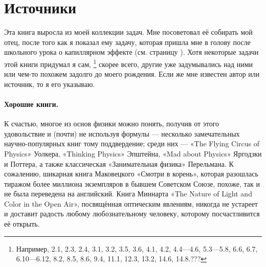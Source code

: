 \section{Источники}

Эта книга выросла из моей коллекции задач.
Мне посоветовал её собирать мой отец, после того как я показал ему задачу, которая пришла мне в голову после школьного урока о капиллярном эффекте (см. страницу \pageref{???}).
Хотя некоторые задачи этой книги придумал я сам,%
\footnote{Например, 2.1, 2.3, 2.4, 3.1, 3.2, 3.5, 3.6, 4.1, 4.2, 4.4---4.6, 5.3---5.8, 6.6, 6.7,
6.10---6.12, 8.2, 8.5, 8.6, 9.4, 11.1, 12.3, 13.2, 14.6, 14.8.???}
скорее всего, другие уже задумывались над ними или чем-то похожем задолго до моего рождения.
Если же мне известен автор или источник, то я его указываю.

\paragraph{Хорошие книги.}
К счастью, %
многое из основ физики можно понять, получив от этого удовольствие и (почти) не используя формулы ---
несколько замечательных научно-популярных книг тому поддвердение;
среди них — «The Flying Circus of Physics» Уолкера,
«Thinking Physics» Эпштейна,
«Mad about Physics» Яргодзки и Поттера,
а также классическая «Занимательная физика» Перельмана.
К сожалению, шикарная книга Маковецкого «Смотри в корень», которая разошлась тиражом более миллиона экземпляров в бывшем Советском Союзе, похоже, так и не была переведена на английский.
Книга Миннарта «The Nature of Light and Color in the Open Air», посвящённая оптическим явлениям, никогда не устареет и доставит радость любому любознательному человеку, которому посчастливится её открыть.

